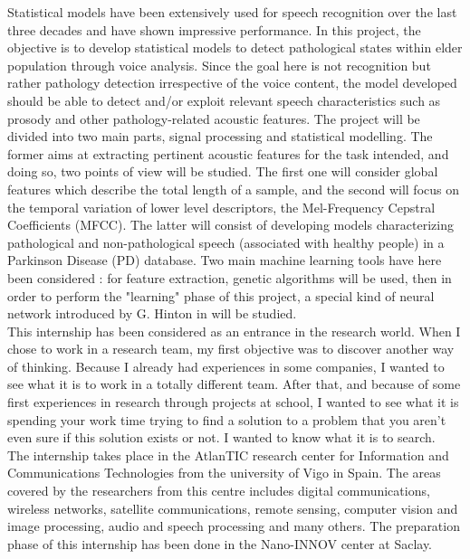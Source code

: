 \documentclass{report}
\begin{document}
	Statistical models have been extensively used for speech recognition over the last three decades and have shown impressive performance. In this project, the objective is to develop statistical models to detect pathological states within elder population through voice analysis. Since the goal here is not recognition but rather pathology detection irrespective of the voice content, the model developed should be able to detect and/or exploit relevant speech characteristics such as prosody and other pathology-related acoustic features. The project will be divided into two main parts, signal processing and statistical modelling. The former aims at extracting pertinent acoustic features for the task intended, and doing so, two points of view will be studied. The first one will consider global features which describe the total length of a sample, and the second will focus on the temporal variation of lower level descriptors, the Mel-Frequency Cepstral Coefficients (MFCC). The latter will consist of developing models characterizing pathological and non-pathological speech (associated with healthy people) in a Parkinson Disease (PD) database. Two main machine learning tools have here been considered : for feature extraction, genetic algorithms will be used, then in order to perform the "learning" phase of this project, a special kind of neural network introduced by G. Hinton in \cite{hinton2006fast} will be studied.\\
	
	This internship has been considered as an entrance in the research world. When I chose to work in a research team, my first objective was to discover another way of thinking. Because I already had experiences in some companies, I wanted to see what it is to work in a totally different team. After that, and because of some first experiences in research through projects at school, I wanted to see what it is spending your work time trying to find a solution to a problem that you aren't even sure if this solution exists or not. I wanted to know what it is to search.\\
	
	The internship takes place in the AtlanTIC research center for Information and Communications Technologies from the university of Vigo in Spain. The areas covered by the researchers from this centre includes digital communications, wireless networks, satellite communications, remote sensing, computer vision and image processing, audio and speech processing and many others. The preparation phase of this internship has been done in the Nano-INNOV center at Saclay.\\
	
\end{document}
